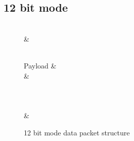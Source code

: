 \documentclass[]{article}
\begin{document}
\subsection{12 bit mode}
\begin{figure}[H]
	\centering
	\begin{bytefield}[bitwidth=2em]{16}
		 \\
		 &  \\
		 \\
		\begin{rightwordgroup}{Payload}
			 &  \\
			 & \\
			 \\
			 \\
			 \\
			 & 
		\end{rightwordgroup}
	\end{bytefield}
	\caption{12 bit mode data packet structure}
\end{figure}
\end{document}
